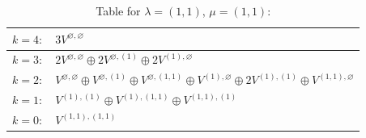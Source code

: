 \documentclass[a4paper,12pt]{article}
\begin{document}
\renewcommand{\arraystretch}{1.6} 
\begin{table}[H]
\centering
\caption{Table for $\lambda = (1, 1)$, $\mu = (1, 1)$:}
\begin{tabular}{|>{\centering\arraybackslash}p{15cm}|}
\hline
 $k = 4: \quad 3 V^{\varnothing, \varnothing} $ \\ \hline
 $k = 3: \quad 2 V^{\varnothing, \varnothing} \oplus 2 V^{\varnothing, (1)} \oplus 2 V^{(1), \varnothing} $ \\ \hline
 $k = 2: \quad V^{\varnothing, \varnothing} \oplus V^{\varnothing, (1)} \oplus V^{\varnothing, (1, 1)} \oplus V^{(1), \varnothing} \oplus 2 V^{(1), (1)} \oplus V^{(1, 1), \varnothing} $ \\ \hline
 $k = 1: \quad V^{(1), (1)} \oplus V^{(1), (1, 1)} \oplus V^{(1, 1), (1)} $ \\ \hline
 $k = 0: \quad V^{(1, 1), (1, 1)} $ \\ \hline
\end{tabular}
\end{table}

\end{document}

